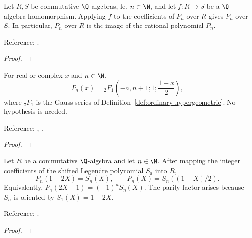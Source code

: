 \begin{supporting}

\begin{theorem}
\label{thm:legendre-maps}
\leanok
Let $R,S$ be commutative $\Q$-algebras, let $n\in\N$, and let $f:R\to S$ be a $\Q$-algebra homomorphism. Applying $f$ to the
coefficients of $P_n$ over $R$ gives $P_n$ over $S$. In particular, $P_n$ over
$R$ is the image of the rational polynomial $P_n$.

Reference: \cite[18.5.5]{dlmf}.
\end{theorem}
\begin{proof}
\leanok
\end{proof}

\begin{theorem}
\label{thm:legendre-hypergeometric}
\leanok
For real or complex $x$ and $n\in\N$,
\[P_n(x)={}_2F_1\!\left(-n,n+1;1;\frac{1-x}2\right),\]
where ${}_2F_1$ is the Gauss series of Definition~\ref{def:ordinary-hypergeometric}. No hypothesis is needed.

Reference: \cite[18.5.7]{dlmf}, \cite[Table 18.3.1]{dlmf}.
\end{theorem}
\begin{proof}
\leanok
\end{proof}

\begin{theorem}
\label{thm:legendre-shifted}
\leanok
Let $R$ be a commutative $\Q$-algebra and let $n\in\N$. After mapping the integer coefficients of the shifted Legendre polynomial $S_n$ into $R$,
\[P_n(1-2X)=S_n(X),\qquad P_n(X)=S_n((1-X)/2).\]
Equivalently, $P_n(2X-1)=(-1)^nS_n(X)$. The parity factor arises because $S_n$ is
oriented by $S_1(X)=1-2X$.

Reference: \cite[18.7.10 and Table 18.6.1]{dlmf}.
\end{theorem}
\begin{proof}
\leanok
\end{proof}


\end{supporting}
